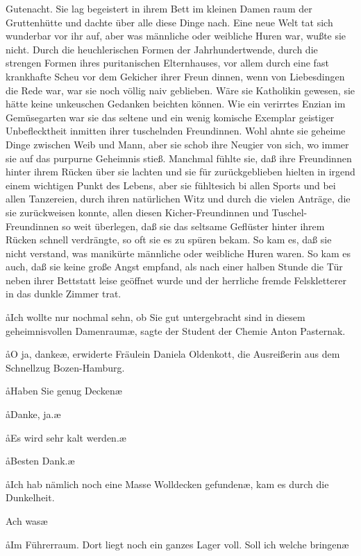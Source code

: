 Gutenacht. Sie lag begeistert in ihrem Bett im kleinen Damen\-%
raum der Gruttenhütte und dachte über alle diese Dinge nach.
Eine neue Welt tat sich wunderbar vor ihr auf, aber was
männliche oder weibliche Huren war, wußte sie nicht. Durch
die heuchlerischen Formen der Jahrhundertwende, durch die
strengen Formen ihres puritanischen Elternhauses, vor allem
durch eine fast krankhafte Scheu vor dem Gekicher ihrer Freun\-%
dinnen, wenn von Liebesdingen die Rede war, war sie noch
völlig naiv geblieben. Wäre sie Katholikin gewesen, sie hätte
keine unkeuschen Gedanken beichten können. Wie ein verirrtes
Enzian im Gemüsegarten war sie das seltene und ein wenig
komische Exemplar geistiger Unbeflecktheit inmitten ihrer
tuschelnden Freundinnen. Wohl ahnte sie geheime Dinge
zwischen Weib und Mann, aber sie schob ihre Neugier von sich,
wo immer sie auf das purpurne Geheimnis stieß. Manchmal
fühlte sie, daß ihre Freundinnen hinter ihrem Rücken über
sie lachten und sie für zurückgeblieben hielten in irgend einem
wichtigen Punkt des Lebens, aber sie fühltesich bi allen
Sports und bei allen Tanzereien, durch ihren natürlichen
Witz und durch die vielen Anträge, die sie zurückweisen konnte,
allen diesen Kicher-Freundinnen und Tuschel-Freundinnen
so weit überlegen, daß sie das seltsame Geflüster hinter ihrem
Rücken schnell verdrängte, so oft sie es zu spüren bekam. So
kam es, daß sie nicht verstand, was manikürte männliche oder
weibliche Huren waren. So kam es auch, daß sie keine große
Angst empfand, als nach einer halben Stunde die Tür neben
ihrer Bettstatt leise geöffnet wurde und der herrliche fremde
Felskletterer in das dunkle Zimmer trat.

\aa{}Ich wollte nur nochmal sehn, ob Sie gut untergebracht sind
in diesem geheimnisvollen Damenraum\ae{}, sagte der Student
der Chemie Anton Pasternak.

\aa{}O ja, danke\ae{}, erwiderte Fräulein Daniela Oldenkott, die
Ausreißerin aus dem Schnellzug Bozen-Hamburg.

\aa{}Haben Sie genug Decken\frag{}\ae{}

\aa{}Danke, ja.\ae{}

\aa{}Es wird sehr kalt werden.\ae{}

\aa{}Besten Dank.\ae{}

\aa{}Ich hab nämlich noch eine Masse Wolldecken gefunden\ae{}, kam
es durch die Dunkelheit.

\aanah{}Ach was\frag{}\ae{}

\aa{}Im Führerraum. Dort liegt noch ein ganzes Lager voll. Soll
ich welche bringen\frag{}\ae{}

